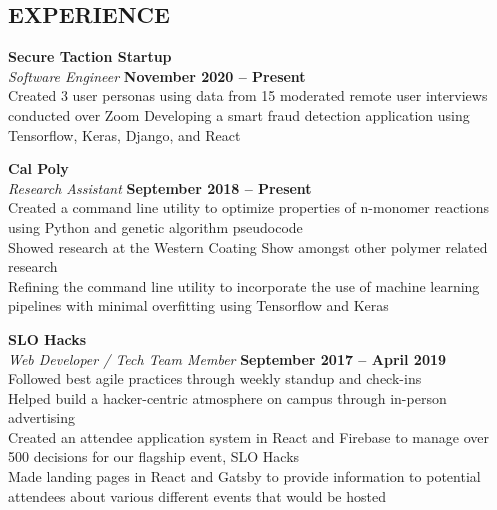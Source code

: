 \documentclass[margin,line]{resume}
\begin{document}
\begin{resume}
\sectionline

    \section{\mysidestyle \textbf{\large{E}\small{XPERIENCE}}}

    \textbf{\listing Secure Taction Startup} \vspace{2mm}\\\vspace{1mm}%
    \textsl{Software Engineer} \hfill \textbf{November 2020 -- Present}\\
    Created 3 user personas using data from 15 moderated remote user interviews conducted over Zoom
    Developing a smart fraud detection application using Tensorflow, Keras, Django, and React

    \textbf{\listing Cal Poly} \vspace{2mm}\\\vspace{1mm}%
    \textsl{Research Assistant} \hfill \textbf{September 2018 -- Present}\\
        Created a command line utility to optimize properties of n-monomer reactions using Python and genetic algorithm pseudocode\\
        Showed research at the Western Coating Show amongst other polymer related research \\
        Refining the command line utility to incorporate the use of machine learning pipelines with minimal overfitting using Tensorflow and Keras

    \textbf{\listing SLO Hacks} \vspace{2mm}\\\vspace{1mm}%
    \textsl{Web Developer / Tech Team Member} \hfill \textbf{September 2017 -- April 2019}\\
        Followed best agile practices through weekly standup and check-ins\\
        Helped build a hacker-centric atmosphere on campus through in-person advertising \\
        Created an attendee application system in React and Firebase to manage over 500 decisions for our flagship event, SLO Hacks \\
        Made landing pages in React and Gatsby to provide information to potential attendees about various different events that would be hosted \\


\end{resume}
\end{document}
